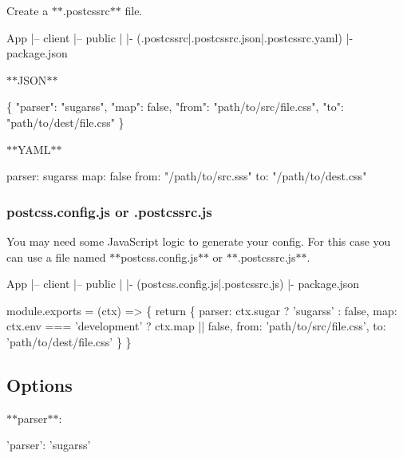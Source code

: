 Create a $\ast$$\ast${\ttfamily .postcssrc}$\ast$$\ast$ file.


\begin{DoxyCode}
App
  |– client
  |– public
  |
  |- (.postcssrc|.postcssrc.json|.postcssrc.yaml)
  |- package.json
\end{DoxyCode}


$\ast$$\ast${\ttfamily J\+S\+ON}$\ast$$\ast$ 
\begin{DoxyCode}
\{
  "parser": "sugarss",
  "map": false,
  "from": "path/to/src/file.css",
  "to": "path/to/dest/file.css"
\}
\end{DoxyCode}


$\ast$$\ast${\ttfamily Y\+A\+ML}$\ast$$\ast$ 
\begin{DoxyCode}
parser: sugarss
map: false
from: "/path/to/src.sss"
to: "/path/to/dest.css"
\end{DoxyCode}


\subsubsection*{{\ttfamily postcss.\+config.\+js} or {\ttfamily .postcssrc.\+js}}

You may need some Java\+Script logic to generate your config. For this case you can use a file named $\ast$$\ast${\ttfamily postcss.\+config.\+js}$\ast$$\ast$ or $\ast$$\ast${\ttfamily .postcssrc.\+js}$\ast$$\ast$.


\begin{DoxyCode}
App
  |– client
  |– public
  |
  |- (postcss.config.js|.postcssrc.js)
  |- package.json
\end{DoxyCode}



\begin{DoxyCode}
module.exports = (ctx) => \{
  return \{
    parser: ctx.sugar ? 'sugarss' : false,
    map: ctx.env === 'development' ? ctx.map || false,
    from: 'path/to/src/file.css',
    to: 'path/to/dest/file.css'
  \}
\}
\end{DoxyCode}


\subsection*{Options}

$\ast$$\ast${\ttfamily parser}$\ast$$\ast$\+:


\begin{DoxyCode}
'parser': 'sugarss'
\end{DoxyCode}


